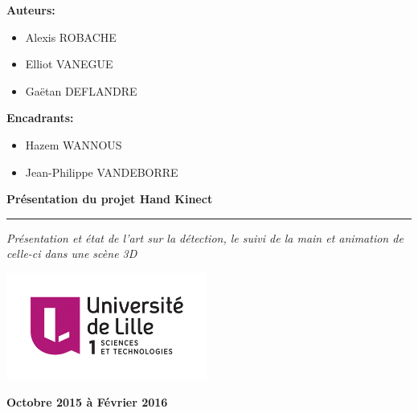 \documentclass{pjsivi}
\begin{document}

\begin{multicols}{2}  

    \textbf{Auteurs:}
    \begin{itemize}
      \item Alexis ROBACHE
      \item Elliot VANEGUE
      \item Gaëtan DEFLANDRE
    \end{itemize}
    
    \textbf{Encadrants:}\\
    \begin{itemize}
      \item Hazem WANNOUS
      \item Jean-Philippe VANDEBORRE 
    \end{itemize}

\end{multicols}

\vspace{3cm}

 \begin{flushright}
  \begin{spacing}{1.6}
    \textbf{
      {\Large Présentation du projet \og Hand Kinect \fg}
    }
  \end{spacing}
  \hrule
  \vspace{0.2cm}
  \textit{
  	{\large\textcolor{mygray}{Présentation et état de l'art sur la détection, le suivi de la main et 
        animation de celle-ci dans une scène 3D}}
  }
\end{flushright}

\vspace{3cm}

\begin{center}
  \includegraphics[height=3.5cm]{images/logoLILLE1.jpg}
  \hfill
  \vspace{3cm}

  \vspace{1cm}
  {\large\textbf{Octobre 2015 à Février 2016}}
\end{center}
\end{document}
